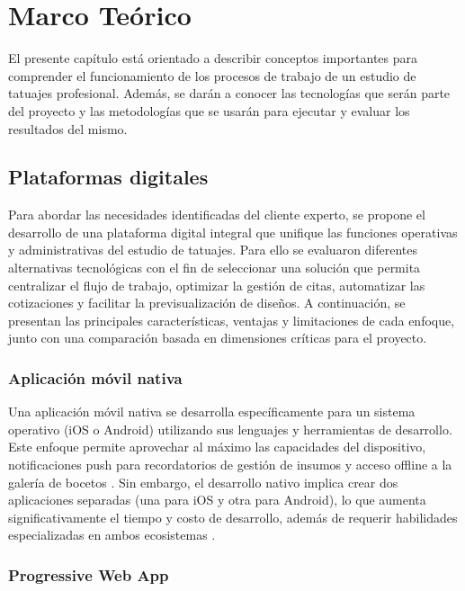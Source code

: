\chapter{Marco Teórico}

El presente capítulo está orientado a describir conceptos importantes para comprender el funcionamiento de los procesos de trabajo de un estudio de tatuajes profesional. Además, se darán a conocer las tecnologías que serán parte del proyecto y las metodologías que se usarán para ejecutar y evaluar los resultados del mismo.

\section{Plataformas digitales}

Para abordar las necesidades identificadas del cliente experto, se propone el desarrollo de una plataforma digital integral que unifique las funciones operativas y administrativas del estudio de tatuajes. Para ello se evaluaron diferentes alternativas tecnológicas con el fin de seleccionar una solución que permita centralizar el flujo de trabajo, optimizar la gestión de citas, automatizar las cotizaciones y facilitar la previsualización de diseños. A continuación, se presentan las principales características, ventajas y limitaciones de cada enfoque, junto con una comparación basada en dimensiones críticas para el proyecto.

\vspace{\parskip}
\subsection{Aplicación móvil nativa }

Una aplicación móvil nativa se desarrolla específicamente para un sistema operativo (iOS o Android) utilizando sus lenguajes y herramientas de desarrollo. Este enfoque permite aprovechar al máximo las capacidades del dispositivo, notificaciones push para recordatorios de gestión de insumos y acceso offline a la galería de bocetos \cite{qutub}\cite{zdnet}. Sin embargo, el desarrollo nativo implica crear dos aplicaciones separadas (una para iOS y otra para Android), lo que aumenta significativamente el tiempo y costo de desarrollo, además de requerir habilidades especializadas en ambos ecosistemas \cite{natively}.

\subsection{Progressive Web App}

